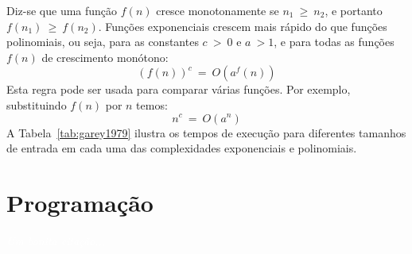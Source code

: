 \documentclass[11pt,fleqn]{book} %
\begin{document}
Diz-se que uma função $f(n)$ cresce monotonamente se $n_1~\geq~n_2$, e portanto $f(n_1)~\geq~f(n_2)$.
Funções exponenciais crescem mais rápido do que funções polinomiais, ou seja, para as constantes $c~>~0$ e $a~> 1$, e para todas as funções $f(n)$ de crescimento monótono:
$$ (f(n))^c~=~O(a^f(n)) $$
Esta regra pode ser usada para comparar várias funções. Por exemplo, substituindo $f(n)$ por $n$ temos:
$$ n^c~=~O(a^n) $$
A Tabela~\ref{tab:garey1979} ilustra os tempos de execução para diferentes tamanhos de entrada em cada uma das complexidades exponenciais e polinomiais.
\begin{table}[htbp]
\centering
\caption{Comparação de tempos de execução polinomiais e exponenciais assumindo que 0,000001s é o tempo gasto para um $n = 1$. Adaptado de ~\textcite{garey1979}.}
\label{tab:garey1979}
\end{table}


\chapter{Programação}\label{programacao}
\vspace{6em}
\begin{flushright}
	\textit{\textcolor{white}{Um bonita citação...}}
\end{flushright}
\vspace{12em}
\end{document}
